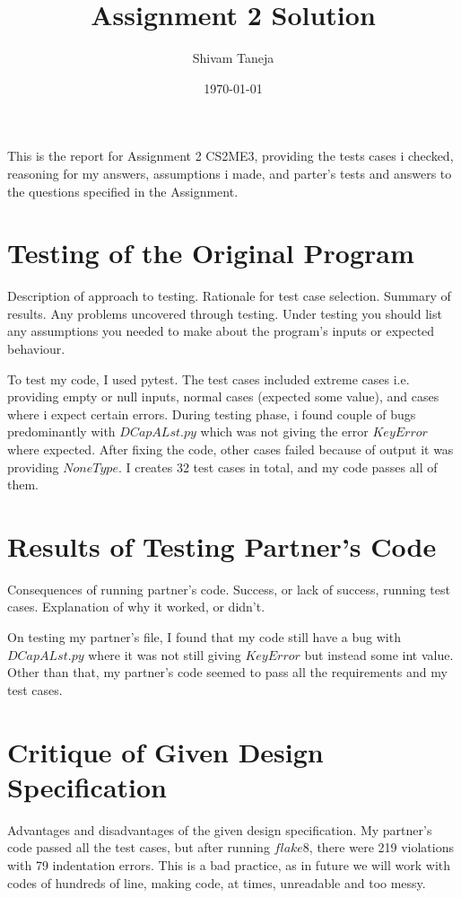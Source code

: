 \documentclass[12pt]{article}
\title{Assignment 2 Solution}
\author{Shivam Taneja}
\date{\today}
\begin{document}
\maketitle

This is the report for Assignment 2 CS2ME3, providing the tests cases i checked, reasoning for my answers, assumptions i made, and parter’s tests and answers to the questions specified in the Assignment.
\section{Testing of the Original Program}
Description of approach to testing. Rationale for test case selection. Summary of results. Any problems uncovered through testing. Under testing you should list any assumptions you needed to make about the program’s inputs or expected behaviour.

To test my code, I used pytest. The test cases included extreme cases i.e. providing empty or null inputs, normal cases (expected some value), and cases where i expect certain errors. During testing phase, i found couple of bugs predominantly with $DCapALst.py$  which was not giving the error $KeyError$ where expected. After fixing the code, other cases failed because of output it was providing $NoneType$.
I creates 32  test cases in total, and my code passes all of them. 

\section{Results of Testing Partner's Code}
Consequences of running partner's code.  Success, or lack of success, running
test cases.  Explanation of why it worked, or didn't.

On testing my partner's file, I found that my code still have a bug with $DCapALst.py$ where it was not still giving $KeyError$ but instead some int value. Other than that, my partner's code seemed to pass all the requirements and my test cases.  


\section{Critique of Given Design Specification}

Advantages and disadvantages of the given design specification.
My partner's code passed all the test cases, but after running $flake8$, there were 219 violations with 79 indentation errors. This is a bad practice, as in future we will work with codes of hundreds of line, making code, at times, unreadable and too messy.
\end{document}
